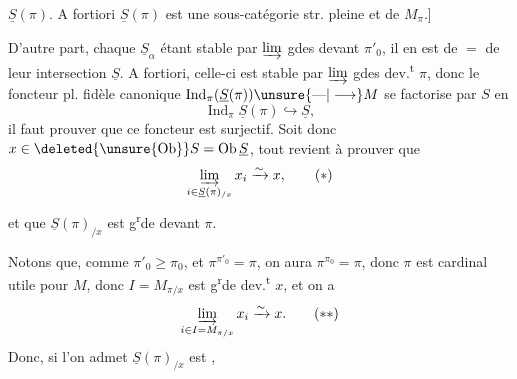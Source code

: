 
$\underline S(\pi)$. A fortiori $\underline S(\pi)$ est une sous-catégorie
str. pleine et  de $M_\pi$.]

 D'autre part, chaque $\underline S_\alpha$ étant stable  par
$\varinjlim$ gdes devant $\pi'_0$, il en est de $=$ de
leur intersection $\underline S$. A fortiori, celle-ci
est stable par $\varinjlim$ gdes dev.\textsuperscript{t} $\pi$, donc
le foncteur pl. fidèle canonique
$\operatorname{Ind}_\pi(\underline S(\pi))\unsure{\text{---}|\longrightarrow}M$ se factorise par $S$
en
\[
\operatorname{Ind}_\pi\underline S(\pi)\hookrightarrow\underline S,
\]
il faut prouver que ce foncteur est
 surjectif. Soit donc $x\in\deleted{\unsure{\operatorname{Ob}}}S=\operatorname{Ob}\underline S$,
tout revient à prouver que
\[
\varinjlim_{i\in\underline S(\pi)_{/x}}x_i\xrightarrow{\sim}x,\tag*{$(*)$}
\]
et que $\underline S(\pi)_{/x}$ est g\textsuperscript{r}de devant $\pi$.

 Notons que, comme $\pi'_0\geq\pi_0$, et 
$\pi^{\pi'_0}=\pi$, on aura $\pi^{\pi_0}=\pi$, donc $\pi$ est
cardinal utile pour $M$, donc 
$I=M_{\pi/x}$ est g\textsuperscript{r}de dev.\textsuperscript{t} $x$, et on a
\[
\varinjlim_{i\in I=M_{\pi/x}}x_i\xrightarrow{\sim}x.\tag*{$(**)$}
\]
Donc, si l'on admet  $\underline S(\pi)_{/x}$ est ,
